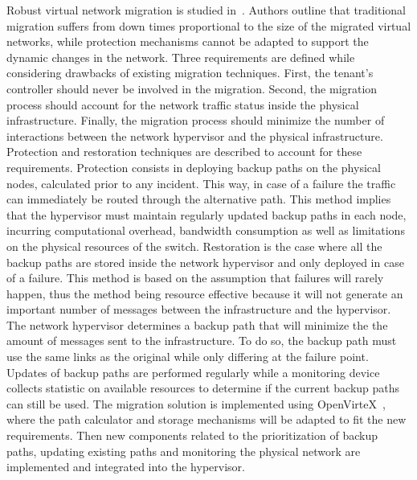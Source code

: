 Robust virtual network migration is studied in~\cite{Ko2017c}. Authors outline that traditional migration suffers from down times proportional to the size of the migrated virtual networks, while protection mechanisms cannot be adapted to support the dynamic changes in the network.
Three requirements are defined while considering drawbacks of existing migration techniques. 
First, the tenant's controller should never be involved in the migration.
Second, the migration process should account for the network traffic status inside the physical infrastructure.
Finally, the migration process should minimize the number of interactions between the network hypervisor and the physical infrastructure.
Protection and restoration techniques are described to account for these requirements.
Protection consists in deploying backup paths on the physical nodes, calculated prior to any incident.
This way, in case of a failure the traffic can immediately be routed through the alternative path. 
This method implies that the hypervisor must maintain regularly updated backup paths in each node, incurring computational overhead, bandwidth consumption as well as limitations on the physical resources of the switch.
Restoration is the case where all the backup paths are stored inside the network hypervisor and only deployed in case of a failure.
This method is based on the assumption that failures will rarely happen, thus the method being resource effective because it will not generate an important number of messages between the infrastructure and the hypervisor.
The network hypervisor determines a backup path that will minimize the the amount of messages sent to the infrastructure.
To do so, the backup path must use the same links as the original while only differing at the failure point.
Updates of backup paths are performed regularly while a monitoring device collects statistic on available resources to determine if the current backup paths can still be used.
The migration solution is implemented using OpenVirteX~\cite{OpenVirteX-Al-Shabibi2014}, where the path calculator and storage mechanisms will be adapted to fit the new requirements. Then new components related to the prioritization of backup paths, updating existing paths and monitoring the physical network are implemented and integrated into the hypervisor.

